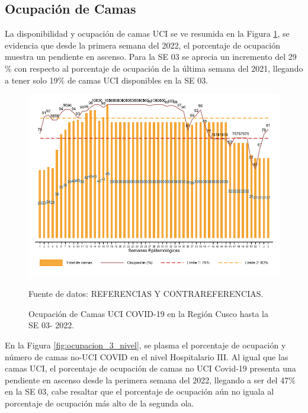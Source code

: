 \documentclass[12pt,a4paper,openany]{book}
\begin{document}
\clearpage
\subsection*{Ocupación de Camas}
\noindent La disponibilidad y ocupación de camas UCI se ve resumida en la Figura \ref{fig:ocupacion_uci}, se evidencia que desde la primera semana del 2022, el porcentaje de ocupación muestra un pendiente en ascenso. Para la SE 03 se aprecia un incremento del 29$\%$ con respecto al porcentaje de ocupación de la última semana del 2021, llegando a tener solo 19$\%$ de camas UCI disponibles en la SE 03.    

\begin{figure}[h]
	\caption{Ocupación de Camas UCI COVID-19 en la Región Cusco hasta la SE 03- 2022.}\label{fig:ocupacion_uci}
	\begin{center}
		\includegraphics[width=0.95\linewidth]{../figuras/uci.pdf}
	\end{center}
	{\footnotesize {Fuente de datos: REFERENCIAS Y CONTRAREFERENCIAS.}}
\end{figure}
\cleardoublepage

En la Figura \ref{fig:ocupacion_3_nivel}, se plasma el porcentaje de ocupación y número de camas no-UCI COVID en el nivel Hospitalario III. Al igual que las camas UCI, el porcentaje de ocupación de camas no UCI Covid-19 presenta una pendiente en ascenso desde la perimera semana del 2022, llegando a ser del  47$\%$ en la SE 03, cabe resaltar que el porcentaje de ocupación aún no iguala al porcentaje de ocupación más alto de la segunda ola.  
  
\end{document}
